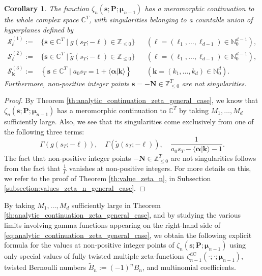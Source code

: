 \documentclass[a4paper,12pt]{article}
\newtheorem{cor}[thm]{Corollary}
\theoremstyle{definition}
\numberwithin{equation}{section}
\newcommand{\dc}{\mathrm{dC}}
\begin{document}
\begin{cor}
\label{cor:set_of_singularities_zeta_n_general_case}
The function $\zeta_{n}(\mathbf{s};\mathbf{P};\boldsymbol{\mu}_{n-1})$ has a meromorphic continuation to the whole complex space $\mathbb{C}^T$, with singularities belonging to a countable union of hyperplanes defined by
\begin{align*}
    \mathcal{S}_{\boldsymbol{\ell}}^{(1)}:=& \{ \mathbf{s} \in \mathbb{C}^T \mid g(s_T;-\boldsymbol{\ell}) \in \mathbb{Z}_{\leq 0} \} && (\boldsymbol{\ell}=(\ell_1,\ldots,\ell_{d-1}) \in \mathbb{N}_0^{d-1}), \\
    \mathcal{S}_{\boldsymbol{\ell}}^{(2)}:=& \{ \mathbf{s} \in \mathbb{C}^T \mid \widetilde{g}(s_T;-\boldsymbol{\ell}) \in \mathbb{Z}_{\leq 0} \} && (\boldsymbol{\ell}=(\ell_1,\ldots,\ell_{d-1}) \in \mathbb{N}_0^{d-1}), \\
    \mathcal{S}_{\mathbf{k}}^{(3)}:=& \left\{ \mathbf{s} \in \mathbb{C}^T \mid a_0s_T=1+\langle \boldsymbol{\alpha}|\mathbf{k} \rangle \right\} && (\mathbf{k}=(k_1,\ldots,k_d) \in \mathbb{N}_0^d).
\end{align*}
Furthermore, non-positive integer points $\mathbf{s}=-\mathbf{N} \in \mathbb{Z}_{\leq 0}^T$ are not singularities.
\end{cor}

\begin{proof}
By Theorem \ref{th:analytic_continuation_zeta_general_case}, we know that $\zeta_{n}(\mathbf{s};\mathbf{P};\boldsymbol{\mu}_{n-1})$ has a meromorphic continuation to $\mathbb{C}^T$ by taking $M_1,\ldots,M_d$ sufficiently large. Also, we see that its singularities come exclusively from one of the following three terms:
$$ \Gamma(g(s_T;-\boldsymbol{\ell})), \quad \Gamma(\widetilde{g}(s_T;-\boldsymbol{\ell})), \quad \frac{1}{a_0s_T-\langle \boldsymbol{\alpha}|\mathbf{k} \rangle-1}. $$
The fact that non-positive integer points $-\mathbf{N} \in \mathbb{Z}_{\leq 0}^T$ are not singularities follows from the fact that $\frac{1}{\Gamma}$ vanishes at non-positive integers. For more details on this, we refer to the proof of Theorem \ref{th:value_zeta_n}, in Subsection \ref{subsection:values_zeta_n_general_case}.
\end{proof}

By taking $M_1,\ldots,M_d$ sufficiently large in Theorem \ref{th:analytic_continuation_zeta_general_case}, and by studying the various limits involving gamma functions appearing on the right-hand side of \eqref{eq:analytic_continuation_zeta_general_case}, we obtain the following explicit formula for the values at non-positive integer points of $\zeta_{n}(\mathbf{s};\mathbf{P};\boldsymbol{\mu}_{n-1})$ using only special values of fully twisted multiple zeta-functions $\zeta_{n-1}^{\dc}(\cdot; \cdot; \boldsymbol{\mu}_{n-1})$, twisted Bernoulli numbers $\widetilde{B}_n:= (-1)^{n}B_n$, and multinomial coefficients.
\end{document}
